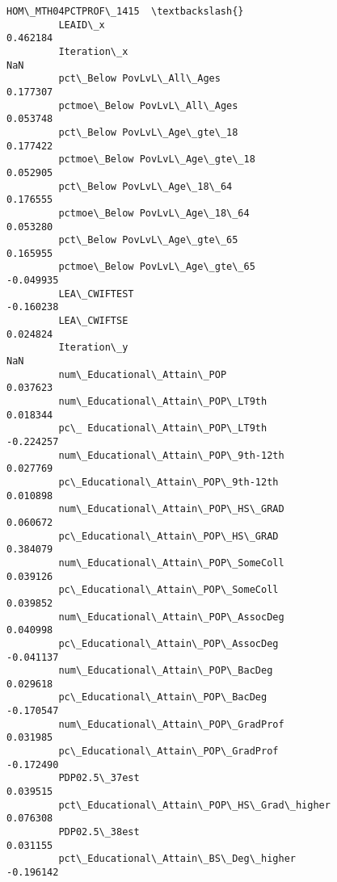 \documentclass[11pt]{article}
\begin{document}
\begin{Verbatim}[commandchars=\\\{\}]
                                                    HOM\_MTH04PCTPROF\_1415  \textbackslash{}
         LEAID\_x                                                 0.462184   
         Iteration\_x                                                  NaN   
         pct\_Below PovLvL\_All\_Ages                               0.177307   
         pctmoe\_Below PovLvL\_All\_Ages                            0.053748   
         pct\_Below PovLvL\_Age\_gte\_18                             0.177422   
         pctmoe\_Below PovLvL\_Age\_gte\_18                          0.052905   
         pct\_Below PovLvL\_Age\_18\_64                              0.176555   
         pctmoe\_Below PovLvL\_Age\_18\_64                           0.053280   
         pct\_Below PovLvL\_Age\_gte\_65                             0.165955   
         pctmoe\_Below PovLvL\_Age\_gte\_65                         -0.049935   
         LEA\_CWIFTEST                                           -0.160238   
         LEA\_CWIFTSE                                             0.024824   
         Iteration\_y                                                  NaN   
         num\_Educational\_Attain\_POP                              0.037623   
         num\_Educational\_Attain\_POP\_LT9th                        0.018344   
         pc\_ Educational\_Attain\_POP\_LT9th                       -0.224257   
         num\_Educational\_Attain\_POP\_9th-12th                     0.027769   
         pc\_Educational\_Attain\_POP\_9th-12th                      0.010898   
         num\_Educational\_Attain\_POP\_HS\_GRAD                      0.060672   
         pc\_Educational\_Attain\_POP\_HS\_GRAD                       0.384079   
         num\_Educational\_Attain\_POP\_SomeColl                     0.039126   
         pc\_Educational\_Attain\_POP\_SomeColl                      0.039852   
         num\_Educational\_Attain\_POP\_AssocDeg                     0.040998   
         pc\_Educational\_Attain\_POP\_AssocDeg                     -0.041137   
         num\_Educational\_Attain\_POP\_BacDeg                       0.029618   
         pc\_Educational\_Attain\_POP\_BacDeg                       -0.170547   
         num\_Educational\_Attain\_POP\_GradProf                     0.031985   
         pc\_Educational\_Attain\_POP\_GradProf                     -0.172490   
         PDP02.5\_37est                                           0.039515   
         pct\_Educational\_Attain\_POP\_HS\_Grad\_higher               0.076308   
         PDP02.5\_38est                                           0.031155   
         pct\_Educational\_Attain\_BS\_Deg\_higher                   -0.196142   

\end{Verbatim}
\end{document}
